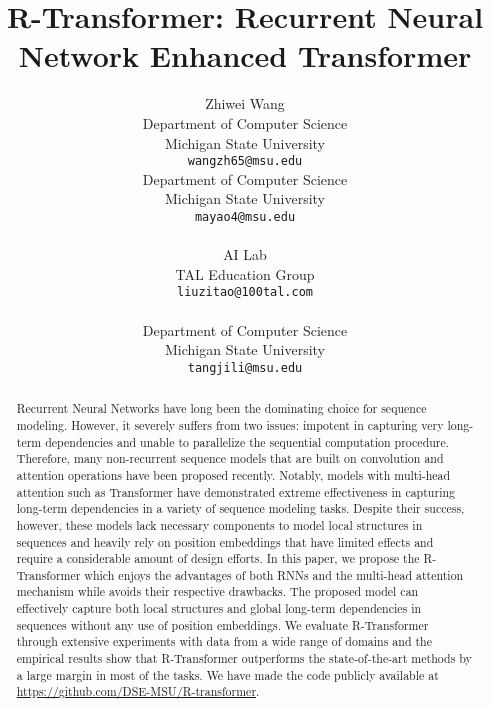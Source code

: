 \documentclass{article} \usepackage{iclr2019_conference,times}
\title{R-Transformer: Recurrent Neural Network Enhanced Transformer}
\author{{Zhiwei Wang} \\
Department of Computer Science\\
Michigan State University\\
\texttt{wangzh65@msu.edu}
\And {Yao Ma} \\
Department of Computer Science\\
Michigan State University\\
\texttt{mayao4@msu.edu} \\
\And {Zitao Liu} \\
AI Lab\\
TAL Education Group \\
\texttt{liuzitao@100tal.com} \\
\And {Jiliang Tang} \\
Department of Computer Science\\
Michigan State University\\
\texttt{tangjili@msu.edu}}
\begin{document}
\maketitle

\begin{abstract}
Recurrent Neural Networks have long been the dominating choice for sequence modeling. However, it severely suffers from two issues: impotent in capturing very long-term dependencies and unable to parallelize the sequential computation procedure. Therefore, many non-recurrent sequence models that are built on convolution and attention operations have been proposed recently. Notably, models with multi-head attention such as Transformer have demonstrated extreme effectiveness in capturing long-term dependencies in a variety of sequence modeling tasks. Despite their success, however, these models lack necessary components to model local structures in sequences and heavily rely on position embeddings that have limited effects and require a considerable amount of design efforts. In this paper, we propose the R-Transformer which enjoys the advantages of both RNNs and the multi-head attention mechanism while avoids their respective drawbacks. The proposed model can effectively capture both local structures and global long-term dependencies in sequences without any use of position embeddings. We evaluate R-Transformer through extensive experiments with data from a wide range of domains and the empirical results show that R-Transformer outperforms the state-of-the-art methods by a large margin in most of the tasks. We have made the code publicly available at \url{https://github.com/DSE-MSU/R-transformer}.
\end{abstract}
\end{document}
